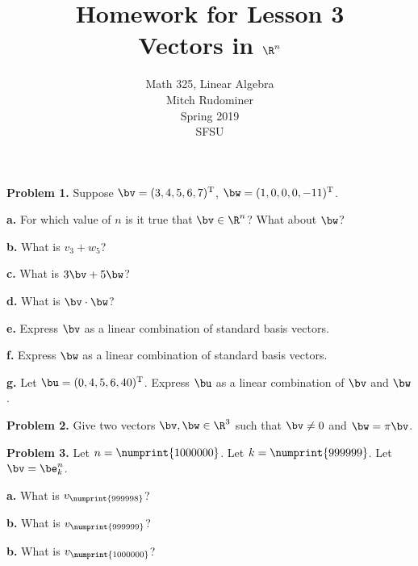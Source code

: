\documentclass[oneside,12pt]{amsart}
\begin{document}
\title{Homework for Lesson 3 \\ Vectors in $\R^n$}
\author{Math 325, Linear Algebra \\ Mitch Rudominer \\ Spring 2019 \\ SFSU }
\date{}

\maketitle


\textbf{Problem 1.} Suppose $\bv = (3, 4, 5, 6, 7)^{\text{T}}$, $\bw = (1, 0 ,0 , 0, -11)^{\text{T}}$.

\bigskip

\textbf{a.} For which value of $n$ is it true that $\bv \in \R^n$? What
about $\bw$?

\bigskip

\textbf{b.} What is $v_3 + w_5$?

\bigskip

\textbf{c.} What is $3 \bv + 5 \bw$?

\bigskip

\textbf{d.} What is $\bv \cdot \bw$?

\bigskip

\textbf{e.} Express $\bv$ as a linear combination of standard basis vectors.

\bigskip

\textbf{f.} Express $\bw$ as a linear combination of standard basis vectors.

\bigskip

\textbf{g.} Let $\bu = (0, 4, 5, 6, 40)^{\text{T}}$. Express $\bu$ as a linear combination
of $\bv$ and $\bw$.

\bigskip

\textbf{Problem 2.} Give two vectors $\bv,\bw\in\R^3$ such that $\bv\not= 0$
and $\bw = \pi \bv$.

\bigskip

\textbf{Problem 3.} Let $n = \numprint{1000000}$. Let $k = \numprint{999999}$. Let
$\bv = \be^n_k$.

\bigskip

\textbf{a.} What is $v_{\numprint{999998}}$?

\bigskip

\textbf{b.} What is $v_{\numprint{999999}}$?

\bigskip

\textbf{b.} What is $v_{\numprint{1000000}}$?

\bigskip
\end{document}
